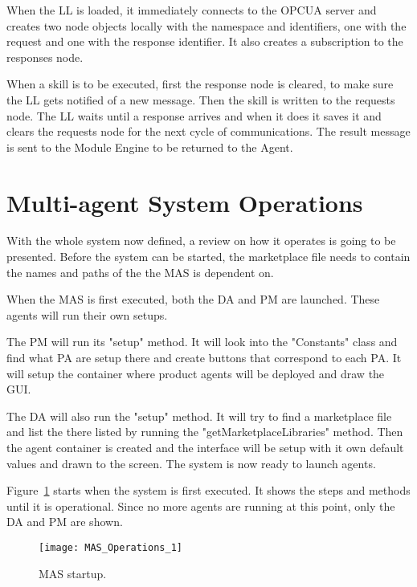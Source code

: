 When the \acrshort{LL} is loaded, it immediately connects to the \acrshort{OPCUA} server and creates two node objects locally with the namespace and identifiers, one with the request and one with the response identifier. It also creates a subscription to the responses node.

When a skill is to be executed, first the response node is cleared, to make sure the \acrshort{LL} gets notified of a new message. Then the skill is written to the requests node. The \acrshort{LL} waits until a response arrives and when it does it saves it and clears the requests node for the next cycle of communications. The result message is sent to the Module Engine to be returned to the Agent.\\


\section{Multi-agent System Operations}
\label{sec:mas_operations}

With the whole system now defined, a review on how it operates is going to be presented. Before the system can be started, the marketplace file needs to contain the names and paths of the  the \acrshort{MAS} is dependent on. 

When the \acrshort{MAS} is first executed, both the \acrlong{DA} and \acrlong{PM} are launched. These agents will run their own setups. 

The \acrshort{PM} will run its "setup" method. It will look into the "Constants" class and find what \acrlong{PA} are setup there and create buttons that correspond to each \acrshort{PA}. It will setup the container where product agents will be deployed and draw the \acrshort{GUI}.

The \acrshort{DA} will also run the "setup" method. It will try to find a marketplace file and list the  there listed by running the "getMarketplaceLibraries" method. Then the agent container is created and the interface will be setup with it own default values and drawn to the screen. The system is now ready to launch agents.

Figure~\ref{fig:mas_operations_1} starts when the system is first executed. It shows the steps and methods until it is operational. Since no more agents are running at this point, only the \acrshort{DA} and \acrshort{PM} are shown.

\begin{figure}[h!]
	\centering
	\texttt{[image: MAS\_Operations\_1]}
	\caption{\acrlong{MAS} startup.}
	\label{fig:mas_operations_1}
\end{figure}

